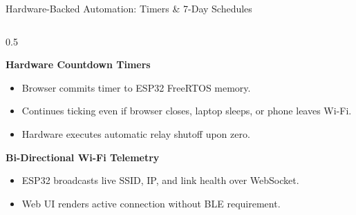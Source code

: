 \documentclass[aspectratio=169, 10pt]{beamer}
\begin{document}
\begin{frame}{Hardware-Backed Automation: Timers \& 7-Day Schedules}
    \begin{columns}[T]
        \begin{column}{0.5\textwidth}
            \begin{block}{\textbf{Hardware Countdown Timers}}
                \begin{itemize}
                    \item Browser commits timer to ESP32 FreeRTOS memory.
                    \item Continues ticking even if browser closes, laptop sleeps, or phone leaves Wi-Fi.
                    \item Hardware executes automatic relay shutoff upon zero.
                \end{itemize}
            \end{block}
            \vspace{0.1cm}
            \begin{block}{\textbf{Bi-Directional Wi-Fi Telemetry}}
                \begin{itemize}
                    \item ESP32 broadcasts live SSID, IP, and link health over WebSocket.
                    \item Web UI renders active connection without BLE requirement.
                \end{itemize}
            \end{block}
        \end{column}
        

\end{columns}
\end{frame}
\end{document}
